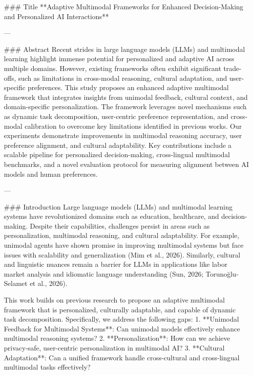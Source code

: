 ### Title  
**Adaptive Multimodal Frameworks for Enhanced Decision-Making and Personalized AI Interactions**

---

### Abstract  
Recent strides in large language models (LLMs) and multimodal learning highlight immense potential for personalized and adaptive AI across multiple domains. However, existing frameworks often exhibit significant trade-offs, such as limitations in cross-modal reasoning, cultural adaptation, and user-specific preferences. This study proposes an enhanced adaptive multimodal framework that integrates insights from unimodal feedback, cultural context, and domain-specific personalization. The framework leverages novel mechanisms such as dynamic task decomposition, user-centric preference representation, and cross-modal calibration to overcome key limitations identified in previous works. Our experiments demonstrate improvements in multimodal reasoning accuracy, user preference alignment, and cultural adaptability. Key contributions include a scalable pipeline for personalized decision-making, cross-lingual multimodal benchmarks, and a novel evaluation protocol for measuring alignment between AI models and human preferences.

---

### Introduction  
Large language models (LLMs) and multimodal learning systems have revolutionized domains such as education, healthcare, and decision-making. Despite their capabilities, challenges persist in areas such as personalization, multimodal reasoning, and cultural adaptability. For example, unimodal agents have shown promise in improving multimodal systems but face issues with scalability and generalization (Mim et al., 2026). Similarly, cultural and linguistic nuances remain a barrier for LLMs in applications like labor market analysis and idiomatic language understanding (Sun, 2026; Torunoğlu-Selamet et al., 2026).

This work builds on previous research to propose an adaptive multimodal framework that is personalized, culturally adaptable, and capable of dynamic task decomposition. Specifically, we address the following gaps:  
1. **Unimodal Feedback for Multimodal Systems**: Can unimodal models effectively enhance multimodal reasoning systems?  
2. **Personalization**: How can we achieve privacy-safe, user-centric personalization in multimodal AI?  
3. **Cultural Adaptation**: Can a unified framework handle cross-cultural and cross-lingual multimodal tasks effectively?  

